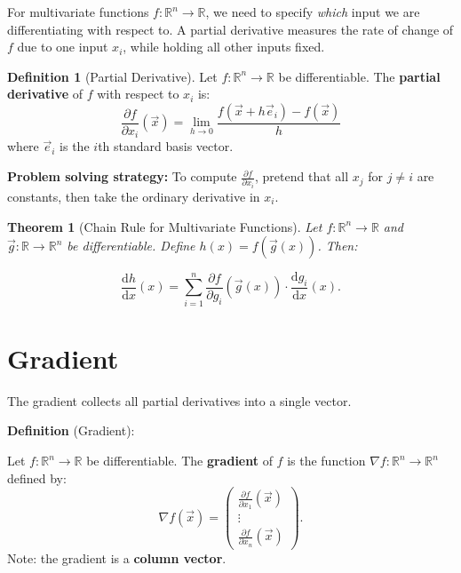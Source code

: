 \documentclass[10pt, twocolumn]{article}
\theoremstyle{definition}
\newtheorem{definition}{Definition}
\theoremstyle{plain}
\newtheorem{theorem}{Theorem}
\newcommand{\RR}{\mathbb{R}}
\begin{document}
For multivariate functions $f: \RR^n \to \RR$, we need to specify \emph{which} input we are differentiating with respect to. A partial derivative measures the rate of change of $f$ due to one input $x_i$, while holding all other inputs fixed.

\begin{definition}[Partial Derivative]
Let $f: \RR^n \to \RR$ be differentiable. The \textbf{partial derivative} of $f$ with respect to $x_i$ is:
\[
    \frac{\partial f}{\partial x_i}(\vec{x}) = \lim_{h \to 0} \frac{f(\vec{x} + h \vec{e}_i) - f(\vec{x})}{h}
\]
where $\vec{e}_i$ is the $i$th standard basis vector.
\end{definition}

\begin{tcolorbox}[colframe=black!50]
\textbf{Problem solving strategy:} To compute $\frac{\partial f}{\partial x_i}$, pretend that all $x_j$ for $j \neq i$ are constants, then take the ordinary derivative in $x_i$.
\end{tcolorbox}

\begin{theorem}[Chain Rule for Multivariate Functions]
Let $f: \RR^n \to \RR$ and $\vec{g}: \RR \to \RR^n$ be differentiable. Define $h(x) = f(\vec{g}(x))$. Then:
\begin{result}
\[
    \frac{\mathrm{d}h}{\mathrm{d}x}(x) = \sum_{i=1}^{n} \frac{\partial f}{\partial g_i}(\vec{g}(x)) \cdot \frac{\mathrm{d}g_i}{\mathrm{d}x}(x).
\]
\end{result}
\end{theorem}

\section{Gradient}

The gradient collects all partial derivatives into a single vector.

\begin{tcolorbox}
\textbf{Definition} (Gradient):

Let $f: \RR^n \to \RR$ be differentiable. The \textbf{gradient} of $f$ is the function $\nabla f: \RR^n \to \RR^n$ defined by:
\[
    \nabla f(\vec{x}) = \begin{pmatrix} \frac{\partial f}{\partial x_1}(\vec{x}) \\ \vdots \\ \frac{\partial f}{\partial x_n}(\vec{x}) \end{pmatrix}.
\]
Note: the gradient is a \textbf{column vector}.
\end{tcolorbox}
\end{document}
